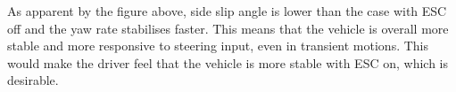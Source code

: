 As apparent by the figure above, side slip angle is lower than the case with ESC off and the yaw rate stabilises faster. This means that the vehicle is overall more stable and more responsive to steering input, even in transient motions. This would make the driver feel that the vehicle is more stable with ESC on, which is desirable.  


